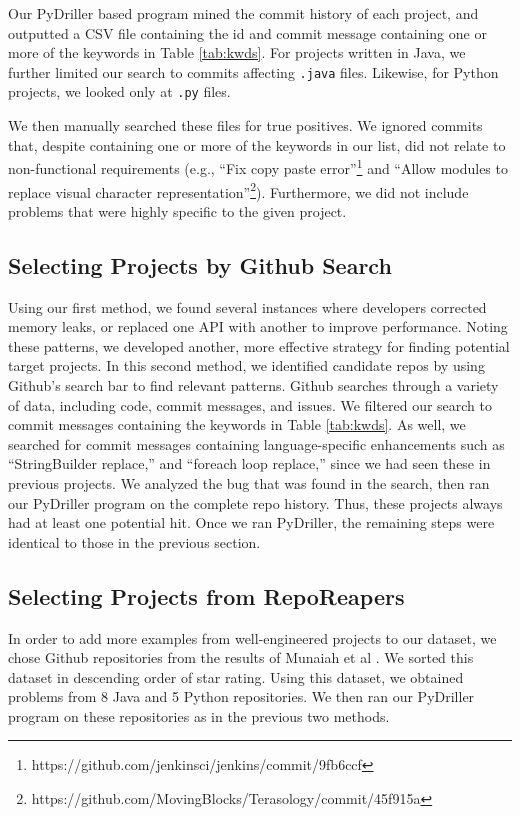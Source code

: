\documentclass[sigconf]{acmart}
\begin{document}
Our PyDriller based program mined the commit history of each project, and outputted a CSV file containing the id and commit message containing one or more of the keywords in Table \ref{tab:kwds}. For projects written in Java, we further limited our search to commits affecting \texttt{.java} files. Likewise, for Python projects, we looked only at \texttt{.py} files.

We then manually searched these files for true positives. We ignored commits that, despite containing one or more of the keywords in our list, did not relate to non-functional requirements (e.g., ``Fix copy paste error''\footnote{https://github.com/jenkinsci/jenkins/commit/9fb6ccf} and ``Allow modules to replace visual character representation''\footnote{https://github.com/MovingBlocks/Terasology/commit/45f915a}). Furthermore, we did not include problems that were highly specific to the given project. 


\subsection{Selecting Projects by Github Search}
Using our first method, we found several instances where developers corrected memory leaks, or replaced one API with another to improve performance. Noting these patterns, we developed another, more effective strategy for finding  potential target projects. In this second method, we identified candidate repos by using Github's search bar to find relevant patterns. Github searches through a variety of data, including code, commit messages, and issues. We filtered our search to commit messages containing the keywords in Table \ref{tab:kwds}. As well, we searched for commit messages containing language-specific enhancements such as ``StringBuilder replace,'' and ``foreach loop replace,'' since we had seen these in previous projects. We analyzed the bug that was found in the search, then ran our PyDriller program on the complete repo history. Thus, these projects always had at least one potential hit. Once we ran PyDriller, the remaining steps were identical to those in the previous section.

\subsection{Selecting Projects from RepoReapers}
In order to add more examples from well-engineered projects to our dataset, we chose Github repositories from the results of Munaiah et al \cite{Munaiah2017}. We sorted this dataset in descending order of star rating. Using this dataset, we obtained problems from 8 Java and 5 Python repositories. We then ran our PyDriller program on these repositories as in the previous two methods. 
\end{document}
